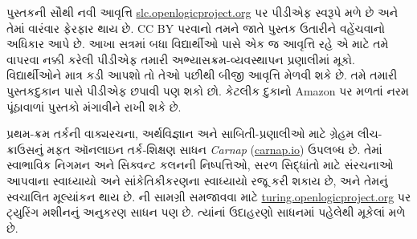 પુસ્તકની સૌથી નવી આવૃત્તિ
\href{https://slc.openlogicproject.org}{slc.openlogicproject.org} પર
પીડીએફ સ્વરૂપે મળે છે અને તેમાં વારંવાર ફેરફાર થાય છે. CC BY પરવાનો
તમને જાતે પુસ્તક ઉતારીને વહેંચવાનો અધિકાર આપે છે. આખા સત્રમાં બધા
વિદ્યાર્થીઓ પાસે એક જ આવૃત્તિ રહે એ માટે તમે વાપરવા નક્કી કરેલી પીડીએફ
તમારી અભ્યાસક્રમ-વ્યવસ્થાપન પ્રણાલીમાં મૂકો. વિદ્યાર્થીઓને માત્ર કડી
આપશો તો તેઓ પછીથી બીજી આવૃત્તિ મેળવી શકે છે. તમે તમારી પુસ્તકદુકાન
પાસે પીડીએફ છપાવી પણ શકો છો. કેટલીક દુકાનો Amazon પર મળતાં નરમ
પૂંઠાવાળાં પુસ્તકો મંગાવીને રાખી શકે છે.

પ્રથમ-ક્રમ તર્કની વાક્યરચના, અર્થવિજ્ઞાન અને સાબિતી-પ્રણાલીઓ માટે
ગ્રેહમ લીચ-ક્રાઉસનું મફત ઑનલાઇન તર્ક-શિક્ષણ સાધન \emph{Carnap}
(\href{https://carnap.io}{carnap.io}) ઉપલબ્ધ છે. તેમાં સ્વાભાવિક નિગમન અને
સિક્વન્ટ કલનની નિષ્પત્તિઓ, સરળ સિદ્ધાંતો માટે સંરચનાઓ આપવાના
સ્વાધ્યાયો અને સાંકેતિકીકરણના સ્વાધ્યાયો રજૂ કરી શકાય છે, અને તેમનું
સ્વચાલિત મૂલ્યાંકન થાય છે. ની સામગ્રી સમજાવવા માટે
\href{https://turing.openlogicproject.org}{turing.openlogicproject.org} પર
ટ્યુરિંગ મશીનનું અનુકરણ સાધન પણ છે. ત્યાંનાં ઉદાહરણો સાધનમાં પહેલેથી
મૂકેલાં મળે છે.
